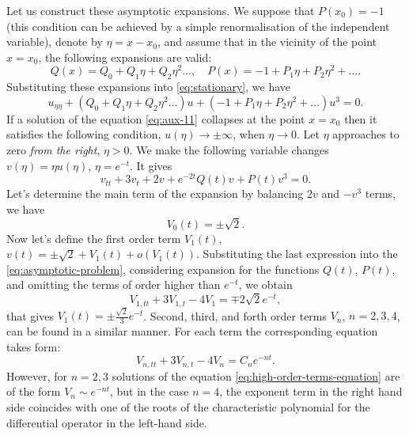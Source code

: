 Let us construct these asymptotic expansions.
We suppose that $P(x_0) = -1$ (this condition can be achieved by a simple renormalisation of the independent variable), denote by $\eta = x - x_0$, and assume that in the vicinity of the point $x = x_0$, the following expansions are valid:
\begin{equation}
	Q(x) = Q_0 + Q_1 \eta + Q_2 \eta^2 \dots, \quad P(x) = -1 + P_1 \eta + P_2 \eta^2 + \dots.
\end{equation}
Substituting these expansions into \eqref{eq:stationary}, we have
\begin{equation}
	u_{\eta\eta} + (Q_0 + Q_1 \eta + Q_2 \eta^2 \dots)u + (-1 + P_1 \eta + P_2 \eta^2 + \dots) u^3 = 0.
	\label{eq:aux-11}
\end{equation}
If a solution of the equation \eqref{eq:aux-11} collapses at the point $x = x_0$ then it satisfies the following condition, $u(\eta) \to \pm \infty$, when $\eta \to 0$.
Let $\eta$ approaches to zero {\it from the right}, $\eta > 0$.
We make the following variable changes $v(\eta) = \eta u(\eta)$, $\eta = e^{-t}$.
It gives
\begin{equation}
	v_{tt} + 3v_{t} + 2v + e^{-2t} Q(t) v + P(t) v^3 = 0.
	\label{eq:asymptotic-problem}
\end{equation}
Let's determine the main term of the expansion by balancing $2v$ and $-v^3$ terms, we have
\begin{equation}
	V_0(t) = \pm \sqrt{2}.
	\label{eq:main-term}
\end{equation}
Now let's define the first order term $V_1(t)$, $v(t) = \pm \sqrt{2} + V_1(t) + o(V_1(t))$.
Substituting the last expression into the \eqref{eq:asymptotic-problem}, considering expansion for the functions $Q(t)$, $P(t)$, and omitting the terms of order higher than $e^{-t}$, we obtain
\begin{equation}
	V_{1, tt} + 3V_{1, t} - 4V_1 = \mp 2 \sqrt{2} e^{-t},
\end{equation}
that gives $V_1(t) = \pm \frac{\sqrt{2}}{3} e^{-t}$.
Second, third, and forth order terms $V_n$, $n = 2, 3, 4$, can be found in a similar manner.
For each term the corresponding equation takes form:
\begin{equation}
	V_{n, tt} + 3V_{n, t} - 4V_n = C_n e^{-nt}.
	\label{eq:high-order-terms-equation}
\end{equation}
However, for $n = 2, 3$ solutions of the equation \eqref{eq:high-order-terms-equation} are of the form $V_n \sim e^{-nt}$, but in the case $n = 4$, the exponent term in the right hand side coincides with one of the roots of the characteristic polynomial for the differential operator in the left-hand side.
